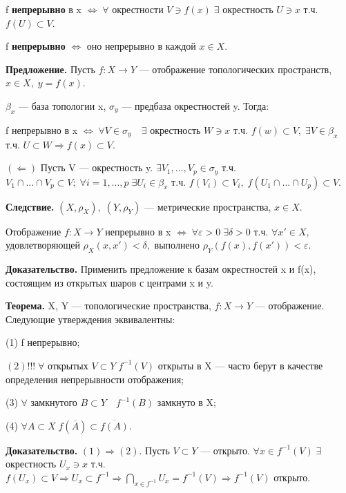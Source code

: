 \documentclass[12pt,a4paper]{article}
\begin{document}
f \textbf{непрерывно} в x $\Leftrightarrow \; \forall$ окрестности $V \ni f(x) \; \exists$ окрестность $U \ni x$ т.ч. $f(U) \subset V.$ 

f \textbf{непрерывно} $\Leftrightarrow$ оно непрерывно в каждой $x \in X.$ 

\textbf{Предложение.} Пусть $f: X \to Y$ --- отображение топологических пространств, $x \in X, \; y = f(x).$ 

$\beta_{x}$ --- база топологии x, $\sigma_{y}$ --- предбаза окрестностей y. Тогда: 

f непрерывно в x $\Leftrightarrow \; \forall V \in \sigma_{y} \quad \exists$ окрестность $W \ni x$ т.ч. $f(w) \subset V, \; \exists V \in \beta_{x}$ т.ч. $U \subset W \Rightarrow f(x) \subset V.$ 

$(\Leftarrow)$ Пусть V --- окрестность y. $\exists V_{1}, ..., V_{p} \in \sigma_{y}$ т.ч. $V_{1} \cap ... \cap V_{p} \subset V; \; \forall i = 1, ..., p \; \exists U_{i} \in \beta_{x}$ т.ч. $f(V_{i}) \subset V_{i}, \; f(U_{1} \cap ... \cap U_{p}) \subset V.$

\textbf{Следствие.} $(X, \rho_{X}), \; (Y, \rho_{Y})$ --- метрические пространства, $x \in X.$ 

Отображение $f: X \to Y$ непрерывно в x $\Leftrightarrow \; \forall \varepsilon > 0 \; \exists \delta > 0$ т.ч. $\forall x' \in X,$ удовлетворяющей $\rho_{X}(x, x') < \delta,$ выполнено $\rho_{Y}(f(x), f(x')) < \varepsilon.$ 

\textbf{Доказательство.} Применить предложение к базам окрестностей x и f(x), состоящим из открытых шаров с центрами x и y. 

\textbf{Теорема.} X, Y --- топологические пространства, $f: X \to Y$ --- отображение. Следующие утверждения эквивалентны: 

(1) f непрерывно; 

$(2)!!! \; \forall$ открытых $V \subset Y \; f^{-1}(V)$ открыты в X --- часто берут в качестве определения непрерывности отображения;

(3) $\forall$ замкнутого $B \subset Y \quad f^{-1}(B)$ замкнуто в X; 

(4) $\forall A \subset X \; f(\overline{A}) \subset \overline{f(A)}.$

\textbf{Доказательство.} $(1) \Rightarrow (2).$ Пусть $V \subset Y$ --- открыто. $\forall x \in f^{-1}(V) \; \exists$ окрестность $U_{x} \ni x$ т.ч. $f(U_{x}) \subset V \Rightarrow U_{x} \subset f^{-1} \Rightarrow \bigcap_{x \in f^{-1}}
 U_{x} = f^{-1}(V) \Rightarrow f^{-1}(V)$ открыто. 
 
\end{document}
